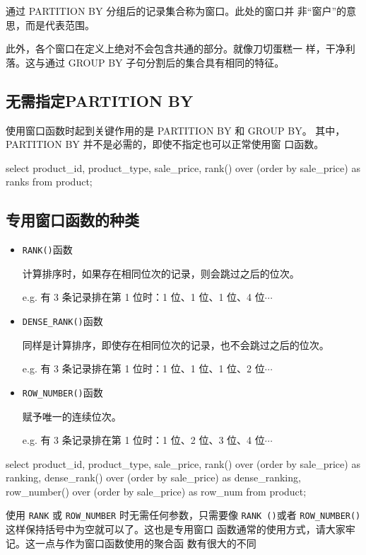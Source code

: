 通过 PARTITION BY 分组后的记录集合称为窗口。此处的窗口并
非“窗户”的意思，而是代表范围。


此外，各个窗口在定义上绝对不会包含共通的部分。就像刀切蛋糕一
样，干净利落。这与通过 GROUP BY 子句分割后的集合具有相同的特征。
\subsection{无需指定PARTITION BY}
使用窗口函数时起到关键作用的是 PARTITION BY 和 GROUP BY。
其中，PARTITION BY 并不是必需的，即使不指定也可以正常使用窗
口函数。

\begin{sqlc}
select product_id, product_type, sale_price,
	rank() over (order by sale_price) as ranks
    from product;
\end{sqlc}

\subsection{专用窗口函数的种类}
\begin{itemize}
\item \verb|RANK()|函数

计算排序时，如果存在相同位次的记录，则会跳过之后的位次。

e.g. 有 3 条记录排在第 1 位时：1 位、1 位、1 位、4 位$\cdots$
\item \verb|DENSE_RANK()|函数

同样是计算排序，即使存在相同位次的记录，也不会跳过之后的位次。

e.g. 有 3 条记录排在第 1 位时：1 位、1 位、1 位、2 位$\cdots$
\item \verb|ROW_NUMBER()|函数

赋予唯一的连续位次。

e.g. 有 3 条记录排在第 1 位时：1 位、2 位、3 位、4 位$\cdots$
\end{itemize}

\begin{sqlc}
select product_id, product_type, sale_price,
	rank() over (order by sale_price) as ranking,
    dense_rank() over (order by sale_price) as dense_ranking,
    row_number() over (order by sale_price) as row_num
    from product;
\end{sqlc}

使用 \verb|RANK| 或 \verb|ROW_NUMBER| 时无需任何参数，只需要像 \verb|RANK ()|或者 \verb|ROW_NUMBER()| 这样保持括号中为空就可以了。这也是专用窗口
函数通常的使用方式，请大家牢记。这一点与作为窗口函数使用的聚合函
数有很大的不同

